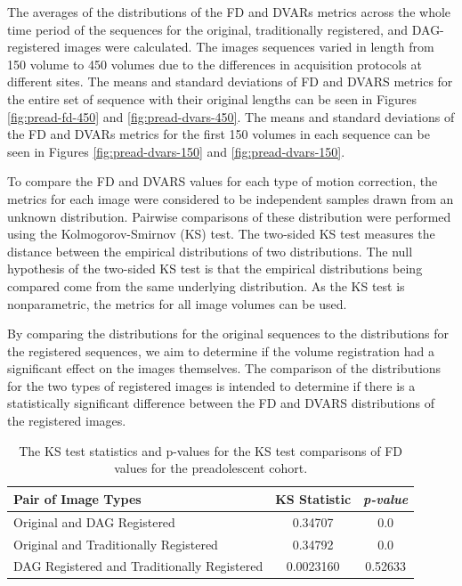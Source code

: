The averages of the distributions of the FD and DVARs metrics across the whole time period of the sequences for the original, traditionally registered, and DAG-registered images were calculated. The images sequences varied in length from 150 volume to 450 volumes due to the differences in acquisition protocols at different sites. The means and standard deviations of FD and DVARS metrics for the entire set of sequence with their original lengths can be seen in Figures \ref{fig:pread-fd-450} and \ref{fig:pread-dvars-450}. The means and standard deviations of the FD and DVARs metrics for the first 150 volumes in each sequence can be seen in Figures \ref{fig:pread-dvars-150} and \ref{fig:pread-dvars-150}. 

To compare the FD and DVARS values for each type of motion correction, the metrics for each image were considered to be independent samples drawn from an unknown distribution. Pairwise comparisons of these distribution were performed using the Kolmogorov-Smirnov (KS) test. The two-sided KS test measures the distance between the empirical distributions of two distributions. The null hypothesis of the two-sided KS test is that the empirical distributions being compared come from the same underlying distribution. As the KS test is nonparametric, the metrics for all image volumes can be used.

By comparing the distributions for the original sequences to the distributions for the registered sequences, we aim to determine if the volume registration had a significant effect on the images themselves. The comparison of the distributions for the two types of registered images is intended to determine if there is a statistically significant difference between the FD and DVARS distributions of the registered images.

\begin{table}[]
\centering
\caption{The KS test statistics and p-values for the KS test comparisons of FD values for the preadolescent cohort.}
\label{tab:pread-ks-fd}
\begin{tabular}{|l|c|c|}
\hline
\textbf{Pair of Image Types} & \multicolumn{1}{l|}{\textbf{KS Statistic}} & \multicolumn{1}{l|}{\textit{\textbf{p-value}}} \\ \hline
Original and DAG Registered                 & 0.34707   & 0.0     \\ \hline
Original and Traditionally Registered       & 0.34792   & 0.0     \\ \hline
DAG Registered and Traditionally Registered & 0.0023160 & 0.52633 \\ \hline
\end{tabular}
\end{table}

